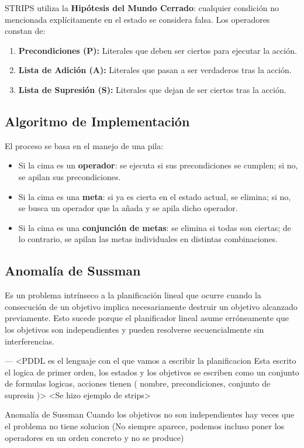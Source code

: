 \bigskip
STRIPS utiliza la \textbf{Hipótesis del Mundo Cerrado}: cualquier condición no mencionada explícitamente en el estado se considera falsa. Los operadores constan de:
\begin{enumerate}
    \item \textbf{Precondiciones (P):} Literales que deben ser ciertos para ejecutar la acción.
    \item \textbf{Lista de Adición (A):} Literales que pasan a ser verdaderos tras la acción.
    \item \textbf{Lista de Supresión (S):} Literales que dejan de ser ciertos tras la acción.
\end{enumerate}

\subsection{Algoritmo de Implementación}
El proceso se basa en el manejo de una pila:
\begin{itemize}
    \item Si la cima es un \textbf{operador}: se ejecuta si sus precondiciones se cumplen; si no, se apilan sus precondiciones.
    \item Si la cima es una \textbf{meta}: si ya es cierta en el estado actual, se elimina; si no, se busca un operador que la añada y se apila dicho operador.
    \item Si la cima es una \textbf{conjunción de metas}: se elimina si todas son ciertas; de lo contrario, se apilan las metas individuales en distintas combinaciones.
\end{itemize}

\subsection{Anomalía de Sussman}
Es un problema intrínseco a la planificación lineal que ocurre cuando la consecución de un objetivo implica necesariamente destruir un objetivo alcanzado previamente. Esto sucede porque el planificador lineal asume erróneamente que los objetivos son independientes y pueden resolverse secuencialmente sin interferencias.

---
<PDDL es el lenguaje con el que vamos a escribir la planificacion
Esta escrito el logica de primer orden, los estados y los objetivos se escriben como un conjunto de formulas logicas, acciones tienen ( nombre, precondiciones, conjunto de supresin )>
<Se hizo ejemplo de strips> 

Anomalía de Sussman 
Cuando los objetivos no son independientes hay veces que el problema no tiene solucion
(No siempre aparece, podemos incluso poner los operadores en un orden concreto y no se produce)


